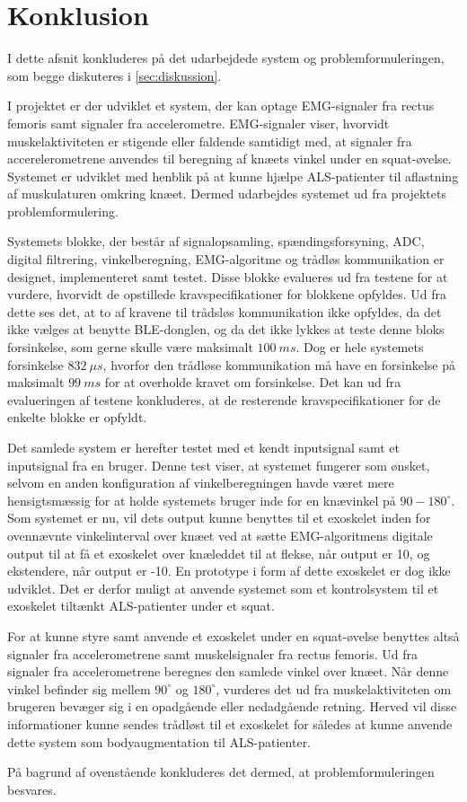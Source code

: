\section{Konklusion}
I dette afsnit konkluderes på det udarbejdede system og problemformuleringen, som begge diskuteres i \autoref{sec:diskussion}. 

I projektet er der udviklet et system, der kan optage EMG-signaler fra rectus femoris samt signaler fra accelerometre. EMG-signaler viser, hvorvidt muskelaktiviteten er stigende eller faldende samtidigt med, at signaler fra accerelerometrene anvendes til beregning af knæets vinkel under en squat-øvelse. Systemet er udviklet med henblik på at kunne hjælpe ALS-patienter til aflastning af muskulaturen omkring knæet. Dermed udarbejdes systemet ud fra projektets problemformulering. 

Systemets blokke, der består af signalopsamling, spændingsforsyning, ADC, digital filtrering, vinkelberegning, EMG-algoritme og trådløs kommunikation er designet, implementeret samt testet. Disse blokke evalueres ud fra testene for at vurdere, hvorvidt de opstillede kravspecifikationer for blokkene opfyldes. Ud fra dette ses det, at to af kravene til trådsløs kommunikation ikke opfyldes, da det ikke vælges at benytte BLE-donglen, og da det ikke lykkes at teste denne bloks forsinkelse, som gerne skulle være maksimalt $100~ms$. Dog er hele systemets forsinkelse $832~\mu s$, hvorfor den trådløse kommunikation må have en forsinkelse på maksimalt $99~ms$ for at overholde kravet om forsinkelse. Det kan ud fra evalueringen af testene konkluderes, at de resterende kravspecifikationer for de enkelte blokke er opfyldt. 

Det samlede system er herefter testet med et kendt inputsignal samt et inputsignal fra en bruger. Denne test viser, at systemet fungerer som ønsket, selvom en anden konfiguration af vinkelberegningen havde været mere hensigtsmæssig for at holde systemets bruger inde for en knævinkel på $90-180^{\circ}$. Som systemet er nu, vil dets output kunne benyttes til et exoskelet inden for ovennævnte vinkelinterval over knæet ved at sætte EMG-algoritmens digitale output til at få et exoskelet over knæleddet til at flekse, når output er 10, og ekstendere, når output er -10. En prototype i form af dette exoskelet er dog ikke udviklet. Det er derfor muligt at anvende systemet som et kontrolsystem til et exoskelet tiltænkt ALS-patienter under et squat.

For at kunne styre samt anvende et exoskelet under en squat-øvelse benyttes altså signaler fra accelerometrene samt muskelsignaler fra rectus femoris. Ud fra signaler fra accelerometrene beregnes den samlede vinkel over knæet. Når denne vinkel befinder sig mellem  $90^{\circ}$ og $180^{\circ}$, vurderes det ud fra muskelaktiviteten om brugeren bevæger sig i en opadgående eller nedadgående retning. Herved vil disse informationer kunne sendes trådløst til et exoskelet for således at kunne anvende dette system som bodyaugmentation til ALS-patienter.

På bagrund af ovenstående konkluderes det dermed, at problemformuleringen besvares. 